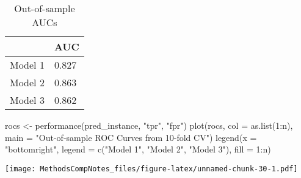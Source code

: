\documentclass[
]{article}
\newenvironment{Shaded}{\begin{snugshade}}{\end{snugshade}}
\newcommand{\AttributeTok}[1]{\textcolor[rgb]{0.77,0.63,0.00}{#1}}
\newcommand{\DecValTok}[1]{\textcolor[rgb]{0.00,0.00,0.81}{#1}}
\newcommand{\FunctionTok}[1]{\textcolor[rgb]{0.00,0.00,0.00}{#1}}
\newcommand{\NormalTok}[1]{#1}
\newcommand{\OtherTok}[1]{\textcolor[rgb]{0.56,0.35,0.01}{#1}}
\newcommand{\SpecialCharTok}[1]{\textcolor[rgb]{0.00,0.00,0.00}{#1}}
\newcommand{\StringTok}[1]{\textcolor[rgb]{0.31,0.60,0.02}{#1}}
\begin{document}
\begin{table}

\caption{\label{tab:unnamed-chunk-30}Out-of-sample AUCs}
\centering
\begin{tabular}[t]{l|l}
\hline
 & AUC\\
\hline
Model 1 & 0.827\\
\hline
Model 2 & 0.863\\
\hline
Model 3 & 0.862\\
\hline
\end{tabular}
\end{table}

\begin{Shaded}
\begin{Highlighting}[]
\NormalTok{rocs }\OtherTok{\textless{}{-}} \FunctionTok{performance}\NormalTok{(pred\_instance, }\StringTok{"tpr"}\NormalTok{, }\StringTok{"fpr"}\NormalTok{)}
\FunctionTok{plot}\NormalTok{(rocs, }\AttributeTok{col =} \FunctionTok{as.list}\NormalTok{(}\DecValTok{1}\SpecialCharTok{:}\NormalTok{n), }\AttributeTok{main =} \StringTok{"Out{-}of{-}sample ROC Curves from 10{-}fold CV"}\NormalTok{)}
\FunctionTok{legend}\NormalTok{(}\AttributeTok{x =} \StringTok{"bottomright"}\NormalTok{, }\AttributeTok{legend =} \FunctionTok{c}\NormalTok{(}\StringTok{"Model 1"}\NormalTok{, }\StringTok{"Model 2"}\NormalTok{, }\StringTok{"Model 3"}\NormalTok{),}
       \AttributeTok{fill =} \DecValTok{1}\SpecialCharTok{:}\NormalTok{n)}
\end{Highlighting}
\end{Shaded}

\texttt{[image: MethodsCompNotes\_files/figure-latex/unnamed-chunk-30-1.pdf]}

\begin{Shaded}
\end{Shaded}
\end{document}
